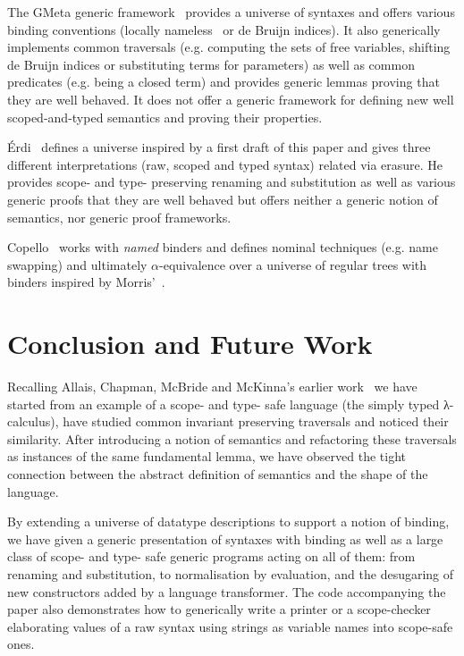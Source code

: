 {The GMeta generic framework~\citeyear{gmeta} provides a universe of syntaxes
and offers various binding conventions (locally nameless~\cite{Chargueraud2012}
or de Bruijn indices). It also generically implements common traversals (e.g. computing
the sets of free variables,
shifting
de Bruijn indices or substituting terms for parameters) as well as common
predicates (e.g. being a closed term) and provides generic lemmas proving that
they are well behaved. It does not offer a generic framework
for defining new well scoped-and-typed semantics and proving their properties.

Érdi~\citeyear{gergodraft} defines a universe inspired by a first draft of this
paper and gives three different interpretations (raw, scoped and typed syntax)
related via erasure. He provides scope- and type- preserving renaming and
substitution as well as various generic proofs that they are well behaved but
offers neither a generic notion of semantics, nor generic proof frameworks.

Copello~\citeyear{copello2017} works with \emph{named} binders and
defines nominal techniques (e.g. name swapping) and ultimately $\alpha$-equivalence
over a universe of regular trees with binders inspired by Morris'~\citeyear{morris-regulartt}.




\section{Conclusion and Future Work}

Recalling Allais, Chapman, McBride and McKinna's earlier work~\citeyear{allais2017type}
we have started from an example of a scope- and type- safe language (the simply typed
λ-calculus), have studied common invariant preserving traversals and noticed their
similarity. After introducing a notion of semantics and refactoring these traversals as
instances of the same fundamental lemma, we have observed the tight
connection between the abstract definition of semantics and the shape of the
language.

By extending a universe of datatype descriptions to support a notion of binding,
we have given a generic presentation of syntaxes with binding as well
as a large class of scope- and type- safe generic programs acting on all of them:
from renaming and substitution, to normalisation by evaluation, and the desugaring
of new constructors added by a language transformer. The code accompanying the
paper also demonstrates how to generically write a printer or a scope-checker
elaborating values of a raw syntax using strings as variable names into scope-safe
ones.

}
